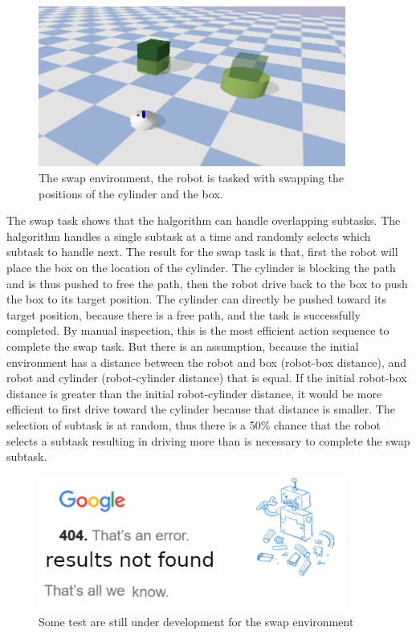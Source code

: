 \begin{figure}[H]
    \centering
    \includegraphics[width=0.9\textwidth]{figures/tests/swap}
    \caption{The swap environment, the robot is tasked with swapping the positions of the cylinder and the box.}%
    \label{fig:benchmark_swap}
\end{figure}
The swap task shows that the \ac{halgorithm} can handle overlapping subtasks. The \ac{halgorithm} handles a single subtask at a time and randomly selects which subtask to handle next. The result for the swap task is that, first the robot will place the box on the location of the cylinder. The cylinder is blocking the path and is thus pushed to free the path, then the robot drive back to the box to push the box to its target position. The cylinder can directly be pushed toward its target position, because there is a free path, and the task is successfully completed. By manual inspection, this is the most efficient action sequence to complete the swap task. But there is an assumption, because the initial environment has a distance between the robot and box (robot-box distance), and robot and cylinder (robot-cylinder distance) that is equal. If the initial robot-box distance is greater than the initial robot-cylinder distance, it would be more efficient to first drive toward the cylinder because that distance is smaller. The selection of subtask is at random, thus there is a 50\% chance that the robot selects a subtask resulting in driving more than is necessary to complete the swap subtask.\bs 

\begin{figure}[H]
    \centering
    \includegraphics[width=0.9\textwidth]{figures/tests/404_not_found}
    \caption{Some test are still under development for the swap environment}%
    \label{fig:results_swap}
\end{figure}

